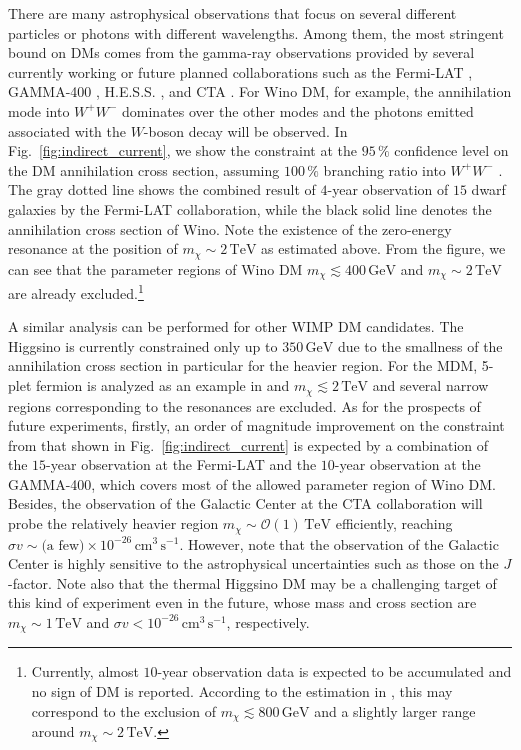 \documentclass[12pt,twoside,book]{article}
\begin{document}
There are many astrophysical observations that focus on several different particles or photons with different wavelengths.
Among them, the most stringent bound on DMs comes from the gamma-ray observations provided by several currently working or future planned collaborations such as the Fermi-LAT \cite{Atwood_2009}, GAMMA-400 \cite{GALPER2013297}, H.E.S.S. \cite{Abdallah:2016ygi}, and CTA \cite{Carr:2015hta}.
For Wino DM, for example, the annihilation mode into $W^{+} W^{-}$ dominates over the other modes and the photons emitted associated with the $W$-boson decay will be observed.
In Fig.~\ref{fig:indirect_current}, we show the constraint at the $95\,\%$ confidence level on the DM annihilation cross section, assuming $100\,\%$ branching ratio into $W^{+} W^{-}$ \cite{Bhattacherjee:2014dya}.
The gray dotted line shows the combined result of $4$-year observation of $15$ dwarf galaxies by the Fermi-LAT collaboration, while the black solid line denotes the annihilation cross section of Wino.
Note the existence of the zero-energy resonance at the position of $m_\chi \sim 2\,\mathrm{TeV}$ as estimated above.
From the figure, we can see that the parameter regions of Wino DM $m_\chi \lesssim 400\,\mathrm{GeV}$ and $m_\chi \sim 2\,\mathrm{TeV}$ are already excluded.\footnote{
  Currently, almost $10$-year observation data is expected to be accumulated and no sign of DM is reported.
  According to the estimation in \cite{Bhattacherjee:2014dya}, this may correspond to the exclusion of $m_\chi \lesssim 800\,\mathrm{GeV}$ and a slightly larger range around $m_\chi \sim 2\,\mathrm{TeV}$.
}

A similar analysis can be performed for other WIMP DM candidates.
The Higgsino is currently constrained only up to $350\,\mathrm{GeV}$ \cite{Krall:2017xij} due to the smallness of the annihilation cross section in particular for the heavier region.
For the MDM, 5-plet fermion is analyzed as an example in \cite{Abdalla:2018mve} and $m_\chi \lesssim 2\,\mathrm{TeV}$ and several narrow regions corresponding to the resonances are excluded.
As for the prospects of future experiments, firstly, an order of magnitude improvement on the constraint from that shown in Fig.~\ref{fig:indirect_current} is expected \cite{Bhattacherjee:2014dya} by a combination of the $15$-year observation at the Fermi-LAT and the $10$-year observation at the GAMMA-400, which covers most of the allowed parameter region of Wino DM.
Besides, the observation of the Galactic Center at the CTA collaboration will probe the relatively heavier region $m_\chi \sim \mathcal{O}(1)\, \mathrm{TeV}$ efficiently, reaching $\sigma v \sim \text{(a few)} \times 10^{-26}\, \mathrm{cm^3\, s^{-1}}$.
However, note that the observation of the Galactic Center is highly sensitive to the astrophysical uncertainties such as those on the $J$-factor.
Note also that the thermal Higgsino DM may be a challenging target of this kind of experiment even in the future, whose mass and cross section are $m_\chi \sim 1\,\mathrm{TeV}$ and $\sigma v < 10^{-26}\, \mathrm{cm^3\, s^{-1}}$, respectively.
\end{document}
